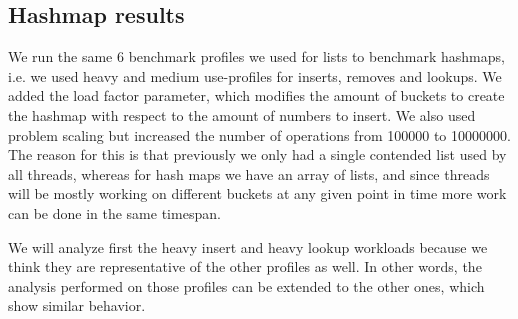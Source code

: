 \documentclass[11pt]{article}
\begin{document}


\subsection{Hashmap results} 
We run the same 6 benchmark profiles we used for
lists to benchmark hashmaps, i.e. we used heavy and medium use-profiles for inserts,
removes and lookups. We added the load factor parameter, which modifies the
amount of buckets to create the hashmap with respect to the amount of
numbers to insert. We also used problem scaling but increased the number of
operations from 100000 to 10000000. The reason for this is that previously we
only had a single contended list used by all threads, whereas for hash maps we
have an array of lists, and since threads will be mostly working on
different buckets at any given point in time more work can be done in the same
timespan.

We will analyze first the heavy insert and heavy lookup workloads because we 
think they are representative of the other profiles as well. In other words, 
the analysis performed on those profiles can be extended to the
other ones, which show similar behavior.
\end{document}
